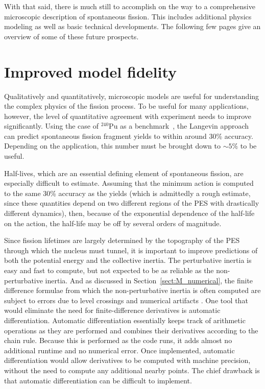 With that said, there is much still to accomplish on the way to a comprehensive microscopic description of spontaneous fission. This includes additional physics modeling as well as basic technical developments. The following few pages give an overview of some of these future prospects.

\section{Improved model fidelity}
Qualitatively and quantitatively, microscopic models are useful for understanding the complex physics of the fission process. To be useful for many applications, however, the level of quantitative agreement with experiment needs to improve significantly. Using the case of $^{240}$Pu as a benchmark~\cite{Sadhukhan2016}, the Langevin approach can predict spontaneous fission fragment yields to within around 30\% accuracy. Depending on the application, this number must be brought down to ${\sim}5\%$ to be useful.

Half-lives, which are an essential defining element of spontaneous fission, are especially difficult to estimate. Assuming that the minimum action is computed to the same 30\% accuracy as the yields (which is admittedly a rough estimate, since these quantities depend on two different regions of the PES with drastically different dynamics), then, because of the exponential dependence of the half-life on the action, the half-life may be off by several orders of magnitude.



Since fission lifetimes are largely determined by the topography of the PES through which the nucleus must tunnel, it is important to improve predictions of both the potential energy and the collective inertia. The perturbative inertia is easy and fast to compute, but not expected to be as reliable as the non-perturbative inertia. And as discussed in Section~\ref{sect:M_numerical}, the finite difference formulae from which the non-perturbative inertia is often computed are subject to errors due to level crossings and numerical artifacts . One tool that would eliminate the need for finite-difference derivatives is automatic differentiation. Automatic differentiation essentially keeps track of arithmetic operations as they are performed and combines their derivatives according to the chain rule. Because this is performed as the code runs, it adds almost no additional runtime and no numerical error. Once implemented, automatic differentiation would allow derivatives to be computed with machine precision, without the need to compute any additional nearby points. The chief drawback is that automatic differentiation can be difficult to implement.

